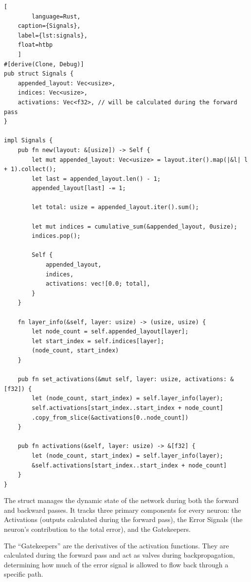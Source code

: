 \begin{lstlisting}[
		language=Rust, 
	caption={Signals}, 
	label={lst:signals},
	float=htbp
	]
#[derive(Clone, Debug)]
pub struct Signals {
	appended_layout: Vec<usize>,
	indices: Vec<usize>,
	activations: Vec<f32>, // will be calculated during the forward pass
}

impl Signals {
	pub fn new(layout: &[usize]) -> Self {
		let mut appended_layout: Vec<usize> = layout.iter().map(|&l| l + 1).collect();
		let last = appended_layout.len() - 1;
		appended_layout[last] -= 1;
		
		let total: usize = appended_layout.iter().sum();
		
		let mut indices = cumulative_sum(&appended_layout, 0usize);
		indices.pop();
		
		Self {
			appended_layout,
			indices,
			activations: vec![0.0; total],
		}
	}
	
	fn layer_info(&self, layer: usize) -> (usize, usize) {
		let node_count = self.appended_layout[layer];
		let start_index = self.indices[layer];
		(node_count, start_index)
	}
	
	pub fn set_activations(&mut self, layer: usize, activations: &[f32]) {
		let (node_count, start_index) = self.layer_info(layer);
		self.activations[start_index..start_index + node_count]
		.copy_from_slice(&activations[0..node_count])
	}
	
	pub fn activations(&self, layer: usize) -> &[f32] {
		let (node_count, start_index) = self.layer_info(layer);
		&self.activations[start_index..start_index + node_count]
	}
}
\end{lstlisting}
The  struct manages the dynamic state of the network during both the forward and backward passes. It tracks three primary components for every neuron: the Activations (outputs calculated during the forward pass), the Error Signals (the neuron's contribution to the total error), and the Gatekeepers.

The \enquote{Gatekeepers} are the derivatives of the activation functions. They are calculated during the forward pass and act as valves during backpropagation, determining how much of the error signal is allowed to flow back through a specific path.

